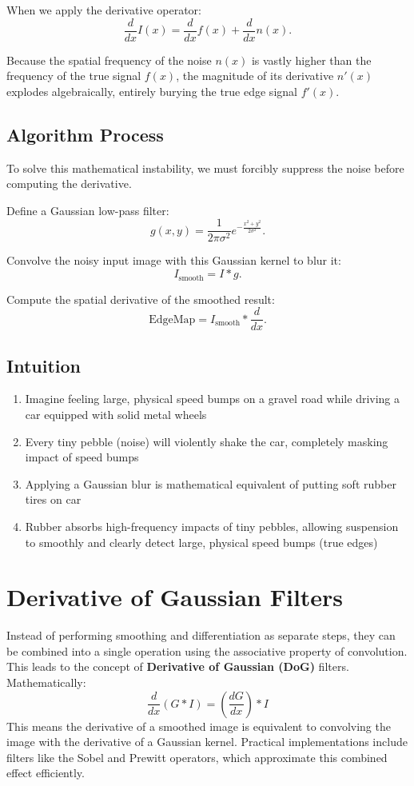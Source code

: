 \documentclass[12pt]{article}
\begin{document}
When we apply the derivative operator:
\[
    \frac{d}{dx} I(x) = \frac{d}{dx} f(x) + \frac{d}{dx} n(x).
\]

Because the spatial frequency of the noise $n(x)$ is vastly higher than the frequency of the true signal $f(x)$, the magnitude of its derivative $n'(x)$ explodes algebraically, entirely burying the true edge signal $f'(x)$.

\subsection{Algorithm Process}

To solve this mathematical instability, we must forcibly suppress the noise before computing the derivative.

Define a Gaussian low-pass filter:
\[
    g(x,y) = \frac{1}{2\pi\sigma^2} e^{-\frac{x^2 + y^2}{2\sigma^2}}.
\]

Convolve the noisy input image with this Gaussian kernel to blur it:
\[
    I_{\text{smooth}} = I * g.
\]

Compute the spatial derivative of the smoothed result:
\[
    \text{EdgeMap} = I_{\text{smooth}} * \frac{d}{dx}.
\]

\subsection{Intuition}
\begin{enumerate}
    \item Imagine feeling large, physical speed bumps on a gravel road while driving a car equipped with solid metal wheels
    \item Every tiny pebble (noise) will violently shake the car, completely masking impact of speed bumps
    \item Applying a Gaussian blur is mathematical equivalent of putting soft rubber tires on car
    \item Rubber absorbs high-frequency impacts of tiny pebbles, allowing suspension to smoothly and clearly detect large, physical speed bumps (true edges)
\end{enumerate}



\section{Derivative of Gaussian Filters}
Instead of performing smoothing and differentiation as separate steps, they can be combined into a single operation using the associative property of convolution. This leads to the concept of \textbf{Derivative of Gaussian (DoG)} filters. Mathematically:
\[
    \frac{d}{dx}(G * I) = \left(\frac{dG}{dx}\right) * I
\]
This means the derivative of a smoothed image is equivalent to convolving the image with the derivative of a Gaussian kernel. Practical implementations include filters like the Sobel and Prewitt operators, which approximate this combined effect efficiently.
\end{document}
